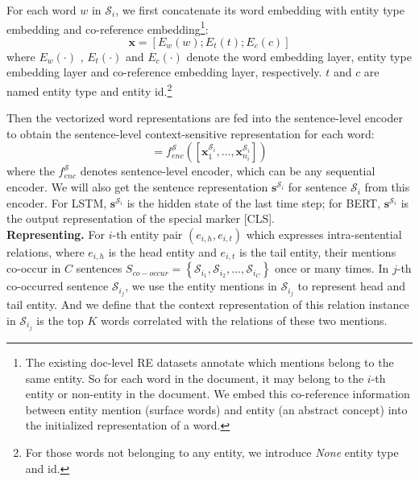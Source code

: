 \documentclass[11pt,a4paper]{article}
\begin{document}
For each word $w$ in $\mathcal{S}_{i}$, we first concatenate its word embedding with entity type embedding and co-reference embedding\footnote{The existing doc-level RE datasets annotate which mentions belong to the same entity. So for each word in the document, it may belong to the $i$-th entity or non-entity in the document. We embed this co-reference information between entity mention (surface words) and entity (an abstract concept) into the initialized representation of a word.}:
\begin{equation}
\textbf{x} = [E_w(w) ; E_t(t); E_c(c)]
\label{embedding}
\end{equation}
where $E_w(\cdot)$ , $E_t(\cdot)$ and $E_c(\cdot)$ denote the word embedding layer, entity type embedding layer and co-reference embedding layer, respectively. $t$ and $c$ are named entity type and entity id.\footnote{For those words not belonging to any entity, we introduce \textit{None} entity type and id.}

Then the vectorized word representations are fed into the sentence-level encoder to obtain the sentence-level context-sensitive representation for each word:
\begin{equation}
[\textbf{g}^{\mathcal{S}_{i}}_{1}, \ldots, \textbf{g}^{\mathcal{S}_{i}}_{n_{i}}] = f_{enc}^{\mathcal{S}}([\textbf{x}^{\mathcal{S}_{i}}_1, \ldots, \textbf{x}^{\mathcal{S}_{i}}_{n_{i}}])
\end{equation}
where the ${f}_{enc}^{\mathcal{S}}$ denotes sentence-level encoder, which can be any sequential encoder. We will also get the sentence representation $\textbf{s}^{\mathcal{S}_i}$ for sentence $\mathcal{S}_i$ from this encoder. For LSTM, $\textbf{s}^{\mathcal{S}_i}$ is the hidden state of the last time step; for BERT, $\textbf{s}^{\mathcal{S}_i}$ is the output representation of the special marker [CLS]. \\
\noindent
\textbf{Representing.} For $i$-th entity pair $(e_{i,h}, e_{i,t})$ which expresses intra-sentential relations, where $e_{i,h}$ is the head entity and $e_{i,t}$ is the tail entity, their mentions co-occur in $C$ sentences $S_{co-occur} = \left\{\mathcal{S}_{i_1}, \mathcal{S}_{i_2}, \ldots,  \mathcal{S}_{i_C}\right\}$ once or many times. 
In $j$-th co-occurred sentence $\mathcal{S}_{i_j}$, we use the entity mentions in $\mathcal{S}_{i_j}$ to represent head and tail entity. And we define that the context representation of this relation instance in $\mathcal{S}_{i_j}$ is the top $K$ words correlated with the relations of these two mentions.
\end{document}
